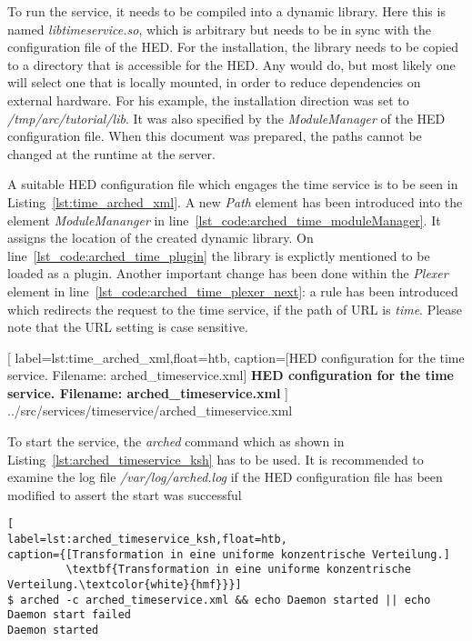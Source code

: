To run the service, it needs to be compiled into a dynamic library. Here this is named \textit{libtimeservice.so}, which is arbitrary but needs to be in sync with the configuration file of the HED.
For the installation, the library needs to be copied to a directory that is accessible for the HED. Any would do, but most likely one will select one that is locally mounted, in order to reduce dependencies on external hardware. For his example, the installation direction was set to \textit{/tmp/arc/tutorial/lib}. It was also specified by the \textit{ModuleManager} of the HED configuration file.
When this document was prepared, the paths cannot be changed at the runtime at the server.

A suitable HED configuration file which engages the time service is to be seen in Listing~\ref{lst:time_arched_xml}.
A new \textit{Path} element has been introduced into the element \textit{ModuleMananger} in line~\ref{lst_code:arched_time_moduleManager}.
It assigns the location of the created dynamic library.
On line~\ref{lst_code:arched_time_plugin} the library is explictly mentioned to be loaded as a plugin.
Another important change has been done within the \textit{Plexer} element in line~\ref{lst_code:arched_time_plexer_next}:
a rule has been introduced which redirects the request to the time service, if the path of URL is \textit{time}. 
Please note that the URL setting is case sensitive.


	[
	label=lst:time_arched_xml,float=htb,
	caption={[HED configuration for the time service. Filename: arched\_timeservice.xml]
	\textbf{HED configuration for the time service. Filename: arched\_timeservice.xml}}
	]
{../src/services/timeservice/arched_timeservice.xml}

To start the service, the \textit{arched} command which as shown in Listing~\ref{lst:arched_timeservice_ksh} has to be used.
It is recommended to examine the log file \textit{/var/log/arched.log} if the HED configuration file has been modified to  assert the start was successful

\begin{lstlisting}[
label=lst:arched_timeservice_ksh,float=htb,
caption={[Transformation in eine uniforme konzentrische Verteilung.]
         \textbf{Transformation in eine uniforme konzentrische Verteilung.\textcolor{white}{hmf}}}]
$ arched -c arched_timeservice.xml && echo Daemon started || echo Daemon start failed
Daemon started
\end{lstlisting}



